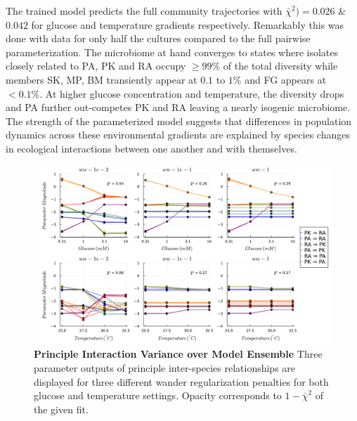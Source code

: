 \documentclass[twocolumn, 10pt]{report}
\begin{document}
{The trained model predicts the full community trajectories with $\bar{\chi}^2) = 0.026$ \& $0.042$ for glucose and temperature gradients respectively. Remarkably this was done with data for only half the cultures compared to the full pairwise parameterization. The microbiome at hand converges to states where isolates closely related to PA, PK and RA occupy $\geq 99\%$ of the total diversity while members SK, MP, BM transiently appear at $0.1$ to $1\%$ and FG appears at $< 0.1\%$. At higher glucose concentration and temperature, the diversity drops and PA further out-competes PK and RA leaving a nearly isogenic microbiome. The strength of the parameterized model suggests that differences in population dynamics across these environmental gradients are explained by species changes in ecological interactions between one another and with themselves.

\begin{figure}[!ht]
    \centering
    \includegraphics[width=2.0\columnwidth]{figs/intrxns_over_wwfits.pdf}
    \centering
    \caption{\textbf{Principle Interaction Variance over Model Ensemble} Three parameter outputs of principle inter-species relationships are displayed for three different wander regularization penalties for both glucose and temperature settings. Opacity corresponds to $1 - \bar{\chi}^2$ of the given fit.}\label{fig:iv}
\end{figure}

}
\end{document}
